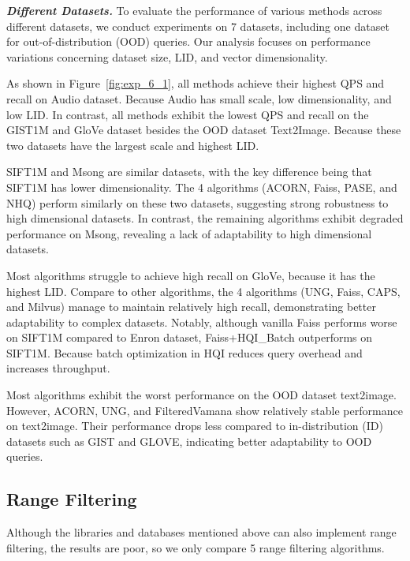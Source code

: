 \documentclass[sigconf, nonacm]{acmart}
\begin{document}
	\textit{\textbf{Different Datasets.}}  
	To evaluate the performance of various methods across different datasets, we conduct experiments on 7 datasets, including one dataset for out-of-distribution (OOD) queries. Our analysis focuses on performance variations concerning dataset size, LID, and vector dimensionality.
	
	As shown in Figure~\ref{fig:exp_6_1}, all methods achieve their highest QPS and recall on Audio dataset. Because Audio has small scale, low dimensionality, and low LID. In contrast, all methods exhibit the lowest QPS and recall on the GIST1M and GloVe dataset besides the OOD dataset Text2Image. Because these two datasets have the largest scale and highest LID.
	
	SIFT1M and Msong are similar datasets, with the key difference being that SIFT1M has lower dimensionality. The 4 algorithms (ACORN, Faiss, PASE, and NHQ) perform similarly on these two datasets, suggesting strong robustness to high dimensional datasets. In contrast, the remaining algorithms exhibit degraded performance on Msong, revealing a lack of adaptability to high dimensional datasets.
	
	Most algorithms struggle to achieve high recall on GloVe, because it has the highest LID. Compare to other algorithms, the 4 algorithms (UNG, Faiss, CAPS, and Milvus) manage to maintain relatively high recall, demonstrating better adaptability to complex datasets. Notably, although vanilla Faiss performs worse on SIFT1M compared to Enron dataset, Faiss+HQI\_Batch outperforms on SIFT1M. Because batch optimization in HQI reduces query overhead and increases throughput.
	
	Most algorithms exhibit the worst performance on the OOD dataset text2image. However, ACORN, UNG, and FilteredVamana show relatively stable performance on text2image. Their performance drops less compared to in-distribution (ID) datasets such as GIST and GLOVE, indicating better adaptability to OOD queries.
	
	\subsection{Range Filtering}
	Although the libraries and databases mentioned above can also implement range filtering, the results are poor, so we only compare 5 range filtering algorithms.
\end{document}
